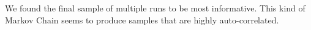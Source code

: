 \documentclass{article} %
\begin{document}
We found the final sample of multiple runs to be most informative. This kind of Markov Chain seems to produce samples that are highly auto-correlated.

\end{document}
